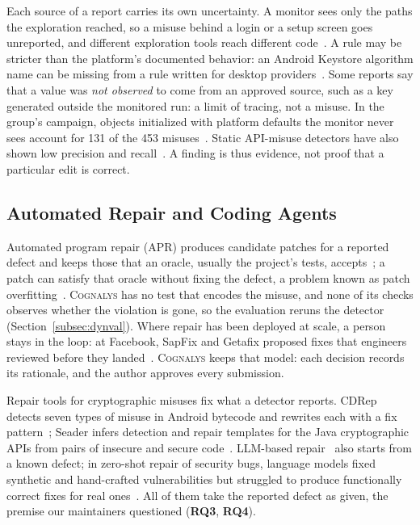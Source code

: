 \documentclass[conference]{IEEEtran}
\newcommand{\system}{\textsc{Cognalys}}
\newcommand{\researchq}[1]{\textbf{RQ#1}}
\begin{document}
Each source of a report carries its own uncertainty. A monitor sees only the
paths the exploration reached, so a misuse behind a login or a setup screen
goes unreported, and different exploration tools reach different code~\cite{costa2026effectiveness}. A rule
may be stricter than the platform's documented behavior: an Android Keystore
algorithm name can be missing from a rule written for desktop providers~\cite{costa2026effectiveness}. Some
reports say that a value was \emph{not observed} to come from an approved
source, such as a key generated outside the monitored run: a limit of tracing,
not a misuse. In the group's campaign, objects initialized with platform
defaults the monitor never sees account for 131 of the 453
misuses~\cite{costa2026effectiveness}. Static API-misuse detectors have also shown low
precision and recall~\cite{amann2019evaluation}. A finding is thus evidence, not proof that a
particular edit is correct.

\subsection{Automated Repair and Coding Agents}
\label{subsec:apr}

Automated program repair (APR) produces candidate patches for a reported
defect and keeps those that an oracle, usually the project's tests,
accepts~\cite{legoues2019apr}; a patch can satisfy that oracle without fixing
the defect, a problem known as patch
overfitting~\cite{smith2015overfitting}. \system{} has no test that encodes
the misuse, and none of its checks observes whether the violation is gone, so
the evaluation reruns the detector (Section~\ref{subsec:dynval}). Where repair
has been deployed at scale, a person stays in the loop: at Facebook, SapFix
and Getafix proposed fixes that engineers reviewed before they
landed~\cite{marginean2019sapfix,bader2019getafix}. \system{} keeps that
model: each decision records its rationale, and the author approves every
submission.

Repair tools for cryptographic misuses fix what a detector reports. CDRep
detects seven types of misuse in Android bytecode and rewrites each with a fix
pattern~\cite{ma2016cdrep}; Seader infers detection and repair templates for
the Java cryptographic APIs from pairs of insecure and secure
code~\cite{zhang2022seader}. LLM-based repair~\cite{xia2023apr,zhang2023apimisuse}
also starts from a known defect; in zero-shot repair of security bugs, language
models fixed synthetic and hand-crafted vulnerabilities but struggled to
produce functionally correct fixes for real ones~\cite{pearce2023zeroshot}.
All of them take the reported defect as given, the premise our maintainers
questioned (\researchq{3}, \researchq{4}).
\end{document}
